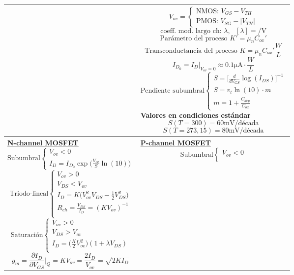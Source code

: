 \documentclass[../main.tex]{subfiles}
\begin{document}
\begin{xltabular}{\textwidth}{|X|X|}
  &
  $$V_{ov} = \begin{cases} \text{NMOS: } V_{GS} - V_{TH}\\\text{PMOS: }V_{SG} - |V_{TH}| \end{cases}$$
  $$\text{coeff. mod. largo ch: } \lambda, ~~~ [\lambda] = \si{\per\V}$$
  $$\text{Parámetro del proceso } K' = \mu_nC_{ox}'$$
  $$\text{Transconductancia del proceso } K = \mu_nC_{ox}'\frac{W}{L}$$
  $$I_{D_0} = I_D\bigg|_{V_{ov}=0}\approx 0.1 \si{\micro\A}\cdot\frac{W}{L}$$
  $$\text{Pendiente subumbral}\begin{cases}
      S = \bigg[\frac{d}{dV_{GS}}\log(I_{DS})\bigg]^{-1} \\
      S = v_t\ln(10)\cdot m                              \\
      m=1+\frac{C_{dep}}{C_{ox}}\end{cases}$$
  \textbf{Valores en condiciones estándar}
  $$S(T=300)  = 60\si{\mV}/\text{década}$$
  $$S(T=273,15) = 80\si{\mV}/\text{década}$$
  \\
  \hline
  \underline{\textbf{N-channel MOSFET}}
  $$\text{Subumbral} \begin{cases}
      V_{ov} < 0 \\
      I_D = I_{D_0}\exp\bigg(\frac{V_{ov}}{S}\ln(10)\bigg)
    \end{cases}$$
  $$\text{Triodo-lineal}\begin{cases}
      V_{ov} > 0                                             \\
      V_{DS} < V_{ov}                                        \\
      I_D = K\bigg(V_{ov}^2V_{DS} -\frac{1}{2}V_{DS}^2\bigg) \\
      R_{ch} = \frac{V_{DS}}{I_D} = (KV_{ov})^{-1}           \\
    \end{cases}$$
  $$\text{Saturación}\begin{cases}
      V_{ov} > 0                                              \\
      V_{DS} > V_{ov}                                         \\
      I_D = \bigg(\frac{K}{2}V_{ov}^2\bigg)(1+\lambda V_{DS}) \\
    \end{cases}$$
  $$g_m = \frac{\partial I_D}{\partial V_{GS}}\bigg|_Q = KV_{ov} = \frac{2I_D}{V_{ov}} = \sqrt{2KI_D}$$
  &
  \underline{\textbf{P-channel MOSFET}}
  $$\text{Subumbral} \begin{cases}
      V_{ov} < 0 \\

\end{cases}$$
\end{xltabular}
\end{document}
